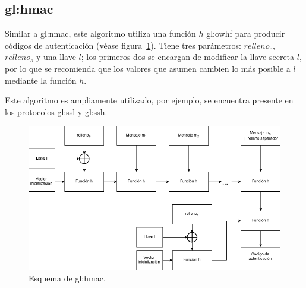 
\subsection{\texorpdfstring{\acrlong{gl:hmac}}{Keyed-Hashed MAC}}
Similar a \gls{gl:nmac}, este algoritmo utiliza una función $h$ \gls{gl:owhf}
para producir códigos de autenticación (véase figura~\ref{mac:hmac}).
Tiene tres parámetros: $relleno_e$, $relleno_s$ y una llave $l$; los primeros
dos se encargan de modificar la llave secreta $l$, por lo que se recomienda que
los valores que asumen cambien lo más posible a $l$ mediante la función $h$.

Este algoritmo es ampliamente utilizado, por ejemplo, se encuentra presente en
los protocolos \gls{gl:ssl} y \gls{gl:ssh}.

\begin{figure}
  \begin{center}
    \includegraphics[width=0.9\linewidth]{diagramas/hmac.png}
    \caption{Esquema de \acrshort{gl:hmac}.}
    \label{mac:hmac}
  \end{center}
\end{figure}
